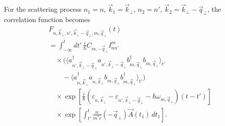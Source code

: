 \documentclass[%
 reprint,
 amsmath,amssymb,
 aps,
]{revtex4-2}
\begin{document}
For the scattering process
$n_1=n$, $\vec{k}_1=\vec{k}_{\perp}$,
$n_2=n'$, $\vec{k}_2=\vec{k}_{\perp}-\vec{q}_{\perp}$,
the correlation function becomes
\begin{equation}
\begin{aligned}
&F_{n,\vec{k}_{\perp},n',\vec{k}_{\perp}-\vec{q}_{\perp},m,\vec{q}_{\perp}}(t)\\
&=
\int_{-\infty}^{t}
dt'\,
\frac{i}{\hbar}
C_{m,-\vec{q}_{\perp}}
I_{n n'}^{m}
\\
&\quad\times
\Big(
\langle
a_{n',\vec{k}_{\perp}-\vec{q}_{\perp}}^{\dagger}
a_{n',\vec{k}_{\perp}-\vec{q}_{\perp}}
b_{m,\vec{q}_{\perp}}^{\dagger}
b_{m,\vec{q}_{\perp}}
\rangle_{t'}
\\
&\qquad
-
\langle
a_{n,\vec{k}_{\perp}}^{\dagger}
a_{n,\vec{k}_{\perp}}
b_{m,\vec{q}_{\perp}}
b_{m,\vec{q}_{\perp}}^{\dagger}
\rangle_{t'}
\Big)
\\
&\quad\times
\exp\left[
\frac{i}{\hbar}
(\varepsilon_{n,\vec{k}_{\perp}}
-
\varepsilon_{n',\vec{k}_{\perp}-\vec{q}_{\perp}}
-
\hbar \omega_{m,\vec{q}_{\perp}})
(t-t')
\right]
\\
&\quad\times
\exp\left[
\int_{t'}^{t}
\frac{ie}{m^* c}
(-\vec{q}_{\perp})
\vec{A}(t_1)
\, dt_1
\right].
\end{aligned}
\end{equation}
\end{document}
